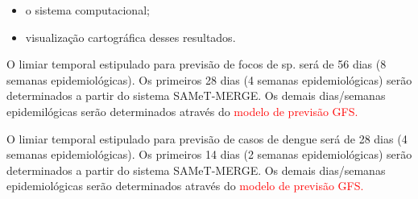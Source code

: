 \begin{itemize}
  \item o sistema computacional;
  \item visualização cartográfica desses resultados.
\end{itemize}

\indent O limiar temporal estipulado para previsão de focos de  sp. será de 56 dias (8 semanas epidemiológicas). Os primeiros 28 dias (4 semanas epidemiológicas) serão determinados a partir do sistema \acrshort{SAMeT}-\acrshort{MERGE}. Os demais dias/semanas epidemilógicas serão determinados através do \textcolor{red}{modelo de previsão \acrshort{GFS}.}

\indent O limiar temporal estipulado para previsão de casos de dengue será de 28 dias (4 semanas epidemiológicas). Os primeiros 14 dias (2 semanas epidemiológicas) serão determinados a partir do sistema \acrshort{SAMeT}-\acrshort{MERGE}. Os demais dias/semanas epidemiológicas serão determinados através do \textcolor{red}{modelo de previsão \acrshort{GFS}.}










